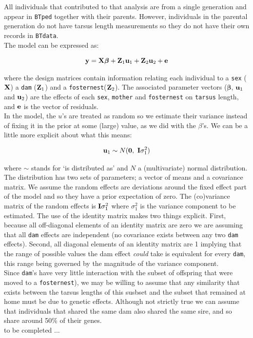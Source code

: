 \documentclass{article}
\begin{document}
All individuals that contributed to that analysis are from a single generation and appear in \texttt{BTped} together with their parents. However, individuals in the parental generation do not have tarsus length measurements so they do not have their own records in \texttt{BTdata}.\\

The model can be expressed as:

\begin{equation}
{\bf y}  = {\bf X}{\bm \beta}+{\bf Z}_{1}{\bf u}_{1}+{\bf Z}_{2}{\bf u}_{2}+{\bf e}
\end{equation}

where the design matrices contain information relating each individual to a  \texttt{sex} (${\bf X}$) a  \texttt{dam} (${\bf Z}_{1}$) and a \texttt{fosternest}(${\bf Z}_{2}$). The associated parameter vectors (${\bm \beta}$, ${\bf u}_{1}$ and ${\bf u}_{2}$) are the effects of each \texttt{sex}, \texttt{mother} and \texttt{fosternest} on \texttt{tarsus} length, and ${\bf e}$ is the vector of residuals.\\

In the model, the $u$'s are treated as random so we estimate their variance instead of fixing it in the prior at some (large) value, as we did with the $\beta$'s.  We can be a little more explicit about what this means:

\begin{equation}
{\bf u}_{1}  \sim N({\bf 0},\ {\bf I}\sigma^{2}_{1})
\end{equation}

where $\sim$ stands for `is distributed as' and $N$ a (multivariate) normal distribution. The distribution has two sets of parameters; a vector of means and a covariance matrix. We assume the random effects are deviations around the fixed effect part of the model and so they have a prior expectation  of zero. The (co)variance matrix of the random effects is ${\bf I}\sigma^{2}_{1}$ where $\sigma^{2}_{1}$ is the variance component to be estimated.  The use of the identity matrix makes two things explicit. First, because all off-diagonal elements of an identity matrix are zero we are assuming that all \texttt{dam} effects are independent (no covariance exists between any two \texttt{dam} effects). Second, all diagonal elements of an identity matrix are 1 implying that the range of possible values the dam effect \emph{could} take is equivalent for every \texttt{dam}, this range being governed by the magnitude of the variance component.\\

Since \texttt{dam}'s have very little interaction with the subset of offspring that were moved to a \texttt{fosternest}), we may be willing to assume that any similarity that exists between the tarsus lengths of this susbset and the subset  that remained at home must be due to genetic effects. Although not strictly true we can assume that individuals that shared the same dam also shared the same sire, and so share around 50\% of their genes.\\

to be completed ...\\    


\ifalone
\end{document}
